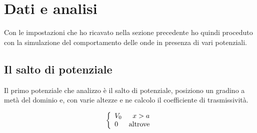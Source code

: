 \section{Dati e analisi}
Con le impostazioni che ho ricavato nella sezione precedente ho quindi proceduto con la simulazione del comportamento delle onde in presenza di vari potenziali.
\subsection{Il salto di potenziale}
Il primo potenziale che analizzo \`e il salto di potenziale, posiziono un gradino a met\`a del dominio e, con varie altezze e ne calcolo il coefficiente di trasmissivit\`a.

\begin{equation}
  \lr\{.{\begin{array}{lr}
      V_0& x>a\\
      0&\text{altrove}
  \end{array}}
\end{equation}

